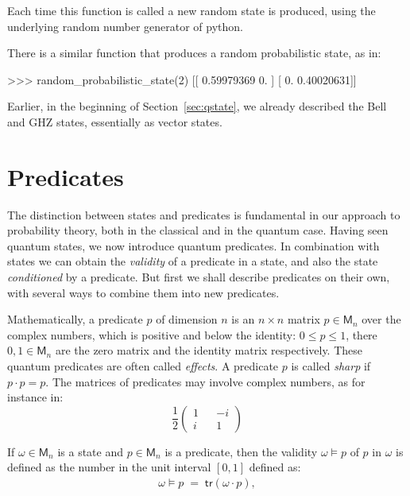 \documentclass[leqno]{tufte-book} %
\newcommand{\Mat}{\mathsf{M}}
\newcommand{\tr}{\mathsf{tr}}
\begin{document}
\noindent Each time this function is called a new random state is
produced, using the underlying random number generator of python.

There is a similar function that produces a random probabilistic state,
as in:
\begin{python}
>>> random_probabilistic_state(2)
[[ 0.59979369  0.        ]
 [ 0.          0.40020631]]
\end{python}

\noindent Earlier, in the beginning of Section~\ref{sec:qstate}, we
already described the Bell and GHZ states, essentially as vector
states.



\section{Predicates}\label{sec:qpred}

The distinction between states and predicates is fundamental in our
approach to probability theory, both in the classical and in the
quantum case. Having seen quantum states, we now introduce quantum
predicates. In combination with states we can obtain the
\emph{validity} of a predicate in a state, and also the state
\emph{conditioned} by a predicate. But first we shall describe
predicates on their own, with several ways to combine them into new
predicates.

Mathematically, a predicate $p$ of dimension $n$ is an $n\times n$
matrix $p\in\Mat_n$ over the complex numbers, which is positive and
below the identity: $0 \leq p \leq 1$, there $0, 1 \in \Mat_{n}$ are
the zero matrix and the identity matrix respectively. These quantum
predicates are often called \emph{effects}. A predicate
$p$ is called
\emph{sharp}
if $p\cdot p = p$.  The matrices of predicates may involve complex
numbers, as for instance in:
$$\frac{1}{2}\left(\begin{array}{ccc}
1 & & -i
\\
i & & 1
\end{array}\right)$$

If $\omega\in\Mat_n$ is a state and $p\in\Mat_n$ is a predicate, then
the validity $\omega\models p$ of $p$ in $\omega$ is defined as the
number in the unit interval $[0,1]$ defined as:
\begin{equation}
\label{eqn:qvalidity}
\begin{array}{rcl}
\omega\models p
\;=\;
\tr(\omega\cdot p),
\end{array}
\end{equation}
\end{document}
